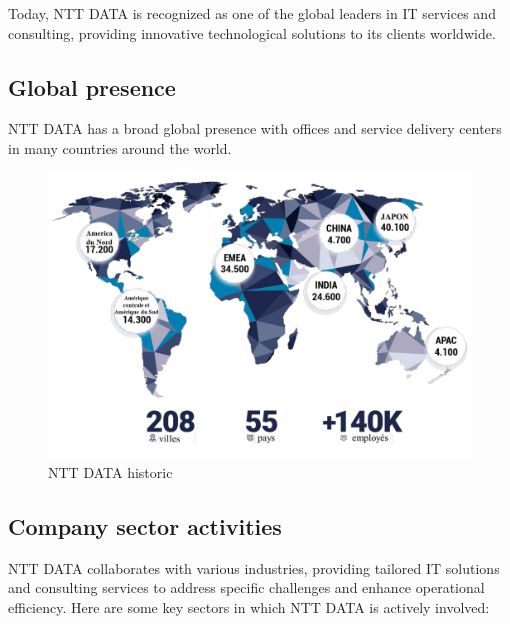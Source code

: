 \documentclass[12pt,a4paper,table,english]{article}
\begin{document}
	Today, NTT DATA is recognized as one of the global leaders in IT services and consulting, providing innovative technological solutions to its clients worldwide.
	
	\subsection{Global presence}
	NTT DATA has a broad global presence with offices and service delivery centers in many countries around the world.
	\begin{figure}[h!]
		\centering
		\includegraphics[width=0.8\linewidth]{Image/nttmap.png}
		\caption{NTT DATA historic}
		\label{fig:NTT DATA historic}
	\end{figure}
	
	\pagebreak
	\subsection{Company sector activities}
	
	NTT DATA collaborates with various industries, providing tailored IT solutions and consulting services to address specific challenges and enhance operational efficiency. Here are some key sectors in which NTT DATA is actively involved:
	
\end{document}
